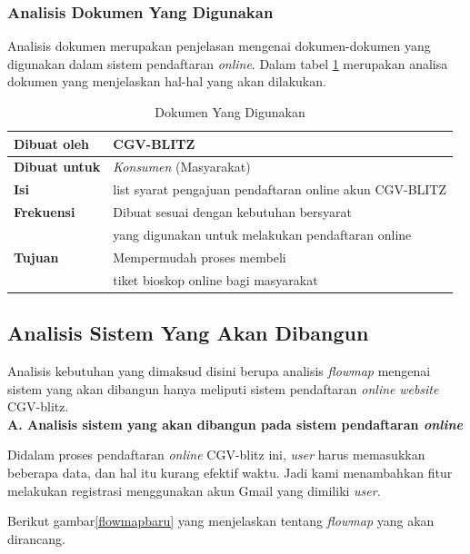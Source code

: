 \subsubsection{Analisis Dokumen Yang Digunakan}
\par
Analisis dokumen merupakan penjelasan mengenai dokumen-dokumen yang digunakan dalam sistem pendaftaran \textit{online}. Dalam tabel \ref{dokumen} merupakan analisa dokumen yang menjelaskan hal-hal yang akan dilakukan.
\\
\begin{table}[!htbp]
\captionsetup{singlelinecheck=off}
\caption{Dokumen Yang Digunakan}
\label{dokumen}
\begin{tabular}{|l|l|}
\hline
\textbf{Dibuat oleh} & CGV-BLITZ \\
\hline
\textbf{Dibuat untuk} & \textit{Konsumen} (Masyarakat)\\
\hline
\textbf{Isi} & list syarat pengajuan pendaftaran online akun CGV-BLITZ \\
\hline
\textbf{Frekuensi} & Dibuat sesuai dengan kebutuhan bersyarat \\ &    yang digunakan untuk melakukan pendaftaran online\\ 
\hline
\textbf{Tujuan} & Mempermudah proses membeli \\ & tiket bioskop online bagi masyarakat   \\
\hline
\end{tabular}
\end{table}


\subsection{Analisis Sistem Yang Akan Dibangun}
\par
Analisis kebutuhan yang dimaksud disini berupa analisis \textit{flowmap} mengenai sistem yang akan dibangun hanya meliputi sistem pendaftaran \textit{online} \textit{website} CGV-blitz.\\

\textbf{A.	Analisis sistem yang akan dibangun pada sistem pendaftaran \textit{online} }\\
\par
Didalam proses pendaftaran \textit{online} CGV-blitz ini, \textit{user} harus memasukkan beberapa data, dan hal itu kurang efektif waktu. Jadi kami menambahkan fitur melakukan registrasi menggunakan akun Gmail yang dimiliki \textit{user}.
\par
Berikut gambar\ref{flowmapbaru} yang menjelaskan tentang \textit{flowmap} yang akan dirancang.

